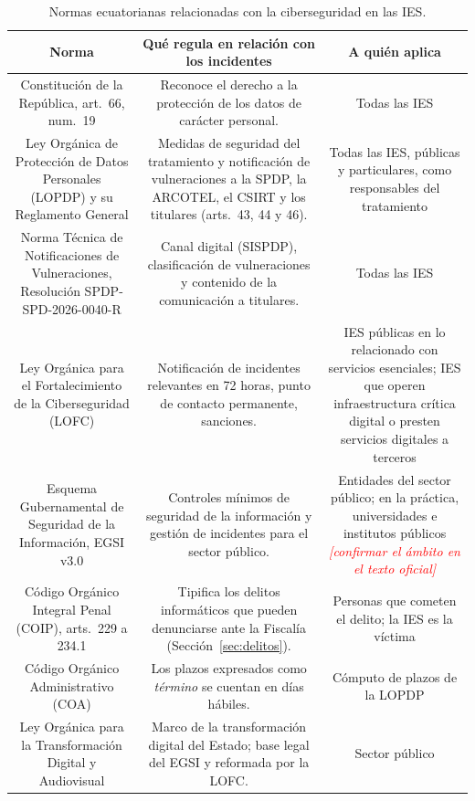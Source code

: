 \documentclass[11pt,a4paper,oneside]{report}
\newcommand{\pendiente}[1]{\textcolor{red}{\textit{[#1]}}}
\begin{document}
\begin{table}[htbp]
  \centering
  \caption{Normas ecuatorianas relacionadas con la ciberseguridad en las IES.}
  \label{tab:normas}
  \small
  \begin{tabular}{|C{0.30}|C{0.42}|C{0.28}|}
    \hline
    \textbf{Norma} & \textbf{Qué regula en relación con los incidentes} & \textbf{A quién aplica} \\
    \hline
    Constitución de la República, art.~66, num.~19 \cite{constitucion2008} & Reconoce el derecho a la protección de los datos de carácter personal. & Todas las IES \\
    \hline
    Ley Orgánica de Protección de Datos Personales (LOPDP) \cite{lopdp2021} y su Reglamento General \cite{reglamentolopdp2023} & Medidas de seguridad del tratamiento y notificación de vulneraciones a la SPDP, la ARCOTEL, el CSIRT y los titulares (arts.~43, 44 y 46). & Todas las IES, públicas y particulares, como responsables del tratamiento \\
    \hline
    Norma Técnica de Notificaciones de Vulneraciones, Resolución SPDP-SPD-2026-0040-R \cite{spdp2026norma} & Canal digital (SISPDP), clasificación de vulneraciones y contenido de la comunicación a titulares. & Todas las IES \\
    \hline
    Ley Orgánica para el Fortalecimiento de la Ciberseguridad (LOFC) \cite{lofc2026} & Notificación de incidentes relevantes en 72 horas, punto de contacto permanente, sanciones. & IES públicas en lo relacionado con servicios esenciales; IES que operen infraestructura crítica digital o presten servicios digitales a terceros \\
    \hline
    Esquema Gubernamental de Seguridad de la Información, EGSI v3.0 \cite{egsi2024} & Controles mínimos de seguridad de la información y gestión de incidentes para el sector público. & Entidades del sector público; en la práctica, universidades e institutos públicos \pendiente{confirmar el ámbito en el texto oficial} \\
    \hline
    Código Orgánico Integral Penal (COIP), arts.~229 a 234.1 \cite{coip2014} & Tipifica los delitos informáticos que pueden denunciarse ante la Fiscalía (Sección~\ref{sec:delitos}). & Personas que cometen el delito; la IES es la víctima \\
    \hline
    Código Orgánico Administrativo (COA) \cite{coa2017} & Los plazos expresados como \textit{término} se cuentan en días hábiles. & Cómputo de plazos de la LOPDP \\
    \hline
    Ley Orgánica para la Transformación Digital y Audiovisual \cite{lotda2023} & Marco de la transformación digital del Estado; base legal del EGSI y reformada por la LOFC. & Sector público \\

\end{tabular}
\end{table}
\end{document}
